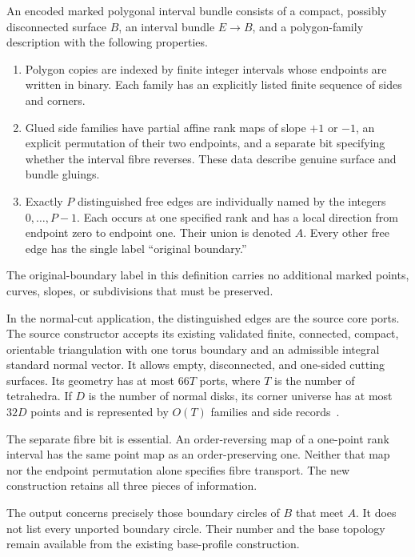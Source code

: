 \begin{definition}
\label{int:definition}
An encoded marked polygonal interval bundle consists of a compact, possibly
disconnected surface $B$, an interval bundle $E\to B$, and a polygon-family
description with the following properties.
\begin{enumerate}
\item Polygon copies are indexed by finite integer intervals whose endpoints
are written in binary.  Each family has an explicitly listed finite sequence
of sides and corners.
\item Glued side families have partial affine rank maps of slope $+1$ or
$-1$, an explicit permutation of their two endpoints, and a separate bit
specifying whether the interval fibre reverses.  These data describe genuine
surface and bundle gluings.
\item Exactly $P$ distinguished free edges are individually named by the
integers $0,\ldots,P-1$.  Each occurs at one specified rank and has a local
direction from endpoint zero to endpoint one.  Their union is denoted $A$.
Every other free edge has the single label ``original boundary.''
\end{enumerate}
The original-boundary label in this definition carries no additional marked
points, curves, slopes, or subdivisions that must be preserved.
\end{definition}

In the normal-cut application, the distinguished edges are the source core
ports.  The source constructor accepts its existing validated finite,
connected, compact, orientable triangulation with one torus boundary and an
admissible integral standard normal vector.  It allows empty, disconnected,
and one-sided cutting surfaces.  Its geometry has at most $66T$ ports, where
$T$ is the number of tetrahedra.  If $D$ is the number of normal disks, its
corner universe has at most $32D$ points and is represented by $O(T)$
families and side records~\cite{ProveIt2026}.

The separate fibre bit is essential.  An order-reversing map of a one-point
rank interval has the same point map as an order-preserving one.  Neither
that map nor the endpoint permutation alone specifies fibre transport.
The new construction retains all three pieces of information.

The output concerns precisely those boundary circles of $B$ that meet $A$.
It does not list every unported boundary circle.  Their number and the base
topology remain available from the existing base-profile construction.


